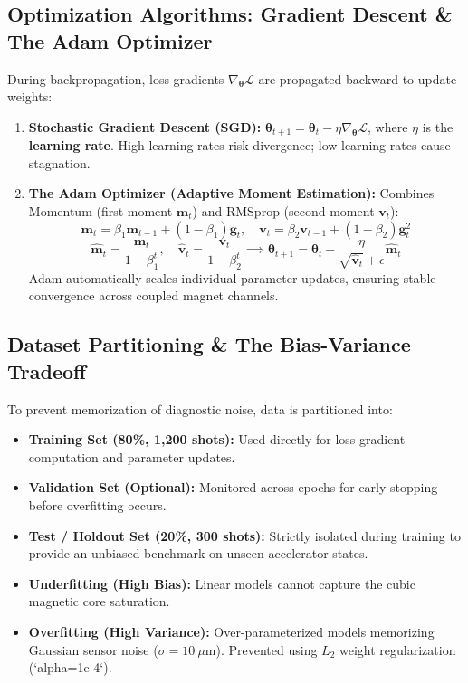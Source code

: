 \documentclass[11pt,a4paper]{article}
\begin{document}
\subsection{Optimization Algorithms: Gradient Descent \& The Adam Optimizer}
During backpropagation, loss gradients $\nabla_{\boldsymbol{\theta}} \mathcal{L}$ are propagated backward to update weights:
\begin{enumerate}
    \item \textbf{Stochastic Gradient Descent (SGD):} $\boldsymbol{\theta}_{t+1} = \boldsymbol{\theta}_t - \eta \nabla_{\boldsymbol{\theta}} \mathcal{L}$, where $\eta$ is the \textbf{learning rate}. High learning rates risk divergence; low learning rates cause stagnation.
    \item \textbf{The Adam Optimizer (Adaptive Moment Estimation):} Combines Momentum (first moment $\mathbf{m}_t$) and RMSprop (second moment $\mathbf{v}_t$):
    \begin{equation}
        \mathbf{m}_t = \beta_1 \mathbf{m}_{t-1} + (1-\beta_1) \mathbf{g}_t, \quad \mathbf{v}_t = \beta_2 \mathbf{v}_{t-1} + (1-\beta_2) \mathbf{g}_t^2
    \end{equation}
    \begin{equation}
        \hat{\mathbf{m}}_t = \frac{\mathbf{m}_t}{1-\beta_1^t}, \quad \hat{\mathbf{v}}_t = \frac{\mathbf{v}_t}{1-\beta_2^t} \implies \boldsymbol{\theta}_{t+1} = \boldsymbol{\theta}_t - \frac{\eta}{\sqrt{\hat{\mathbf{v}}_t} + \epsilon} \hat{\mathbf{m}}_t
    \end{equation}
    Adam automatically scales individual parameter updates, ensuring stable convergence across coupled magnet channels.
\end{enumerate}

\subsection{Dataset Partitioning \& The Bias-Variance Tradeoff}
To prevent memorization of diagnostic noise, data is partitioned into:
\begin{itemize}
    \item \textbf{Training Set (80\%, 1,200 shots):} Used directly for loss gradient computation and parameter updates.
    \item \textbf{Validation Set (Optional):} Monitored across epochs for early stopping before overfitting occurs.
    \item \textbf{Test / Holdout Set (20\%, 300 shots):} Strictly isolated during training to provide an unbiased benchmark on unseen accelerator states.
\end{itemize}
\begin{itemize}
    \item \textbf{Underfitting (High Bias):} Linear models cannot capture the cubic magnetic core saturation.
    \item \textbf{Overfitting (High Variance):} Over-parameterized models memorizing Gaussian sensor noise ($\sigma = 10\ \mu\text{m}$). Prevented using $L_2$ weight regularization (`alpha=1e-4`).
\end{itemize}
\end{document}
